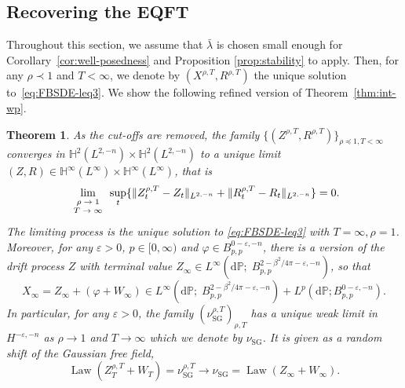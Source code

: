 \documentclass[11pt, a4paper]{scrartcl}
\numberwithin{equation}{section}
\theoremstyle{plain}
\newtheorem{theorem}[foo]{Theorem}
\theoremstyle{remark}
\newcommand{\mathd}{\mathrm{d}}
\newcommand{\tmop}[1]{\ensuremath{\operatorname{#1}}}
\newcommand{\tmscript}[1]{\text{\scriptsize{$#1$}}}
\begin{document}
\subsection{Recovering the EQFT}

Throughout this section, we assume that $\bar{\lambda}$ is chosen small enough for
Corollary~\ref{cor:well-posedness} and Proposition \ref{prop:stability} to
apply. Then, for any $\rho \prec 1$ and $T < \infty$, we denote by $(X^{\rho, T},
	R^{\rho, T})$ the unique solution to~\eqref{eq:FBSDE-leq3}. We show the
following refined version of Theorem~\ref{thm:int-wp}.

\begin{theorem}
	\label{thm:T,rho-convergence}As the cut-offs are removed, the family $\{
		(Z^{\rho, T}, R^{\rho, T}) \}_{\rho \preceq  1, T < \infty}$ converges in
	$\mathbb{H}^2 (L^{2, - n}) \times \mathbb{H}^2 (L^{2, - n})$ to a unique
	limit $(Z, R) \in \mathbb{H}^{\infty} (L^{\infty}) \times
		\mathbb{H}^{\infty} (L^{\infty})$, that is
	\[ \lim_{\tmscript{\begin{array}{c}
					\rho \rightarrow 1 \\
					T \rightarrow \infty
				\end{array}}} \sup_t \{ \| Z^{\rho, T}_t - Z_t \|_{L^{2, - n}} + \|
		R^{\rho, T}_t - R_t \|_{L^{2, - n}} \} = 0. \]
	The limiting process is the unique solution to \eqref{eq:FBSDE-leq3} with $T=\infty, \rho=1$.
	Moreover, for any $\varepsilon > 0$, $p \in [0, \infty)$ and $\varphi \in
		B^{0 - \varepsilon, - n}_{p, p}$, there is a version of the drift process
	$Z$ with terminal value $Z_{\infty} \in L^{\infty} \left( \mathd \mathbb{P} ; \;
		B_{p, p}^{2 - \beta^2 / 4 \pi - \varepsilon, - n} \right)$, so that
	\begin{equation}
		X_{\infty} = Z_{\infty} + (\varphi + W_{\infty}) \in L^{\infty} \left(
		\mathd \mathbb{P} ; \; B_{p, p}^{2 - \beta^2 / 4 \pi - \varepsilon, - n} \right) +
		L^p (\mathd \mathbb{P} ; B_{p, p}^{0 - \varepsilon, - n}) .
		\label{eq:phi-infty-regularity}
	\end{equation}
	In particular, for any $\varepsilon > 0$, the family
	$(\nu_{\tmop{SG}}^{\rho, T})_{\rho, T}$ has a unique weak limit in $H^{-
				\varepsilon, - n}$ as $\rho \rightarrow 1$ and $T \rightarrow \infty$ which
	we denote by $\nu_{\tmop{SG}}$. It is given as a random shift of the
	Gaussian free field,
	\[ \tmop{Law} (Z_T^{\rho, T} + W_T) = \nu^{\rho, T}_{\tmop{SG}} \longrightarrow
		\nu_{\tmop{SG}} = \tmop{Law} (Z_{\infty} + W_{\infty}) . \]
\end{theorem}
\end{document}
